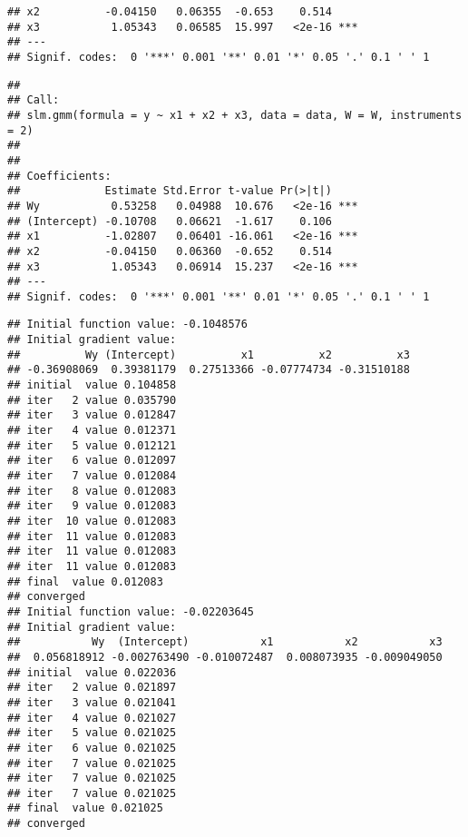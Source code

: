 \begin{knitrout}
\begin{kframe}
\begin{verbatim}
## x2          -0.04150   0.06355  -0.653    0.514    
## x3           1.05343   0.06585  15.997   <2e-16 ***
## ---
## Signif. codes:  0 '***' 0.001 '**' 0.01 '*' 0.05 '.' 0.1 ' ' 1
\end{verbatim}
\begin{alltt}
  \hlstd{=} \hlstd{)}
\end{alltt}
\begin{verbatim}
## 
## Call:
## slm.gmm(formula = y ~ x1 + x2 + x3, data = data, W = W, instruments = 2)
## 
## 
## Coefficients:
##             Estimate Std.Error t-value Pr(>|t|)    
## Wy           0.53258   0.04988  10.676   <2e-16 ***
## (Intercept) -0.10708   0.06621  -1.617    0.106    
## x1          -1.02807   0.06401 -16.061   <2e-16 ***
## x2          -0.04150   0.06360  -0.652    0.514    
## x3           1.05343   0.06914  15.237   <2e-16 ***
## ---
## Signif. codes:  0 '***' 0.001 '**' 0.01 '*' 0.05 '.' 0.1 ' ' 1
\end{verbatim}
\begin{alltt}
 \hlkwb{<-}  \hlopt{~}  \hlopt{+}  \hlopt{+}     \hlstd{=} \hlstd{,}  
                 \hlstd{=} \hlstd{)}
\end{alltt}
\begin{verbatim}
## Initial function value: -0.1048576 
## Initial gradient value:
##          Wy (Intercept)          x1          x2          x3 
## -0.36908069  0.39381179  0.27513366 -0.07774734 -0.31510188 
## initial  value 0.104858 
## iter   2 value 0.035790
## iter   3 value 0.012847
## iter   4 value 0.012371
## iter   5 value 0.012121
## iter   6 value 0.012097
## iter   7 value 0.012084
## iter   8 value 0.012083
## iter   9 value 0.012083
## iter  10 value 0.012083
## iter  11 value 0.012083
## iter  11 value 0.012083
## iter  11 value 0.012083
## final  value 0.012083 
## converged
## Initial function value: -0.02203645 
## Initial gradient value:
##           Wy  (Intercept)           x1           x2           x3 
##  0.056818912 -0.002763490 -0.010072487  0.008073935 -0.009049050 
## initial  value 0.022036 
## iter   2 value 0.021897
## iter   3 value 0.021041
## iter   4 value 0.021027
## iter   5 value 0.021025
## iter   6 value 0.021025
## iter   7 value 0.021025
## iter   7 value 0.021025
## iter   7 value 0.021025
## final  value 0.021025 
## converged
\end{verbatim}

\end{kframe}
\end{knitrout}
